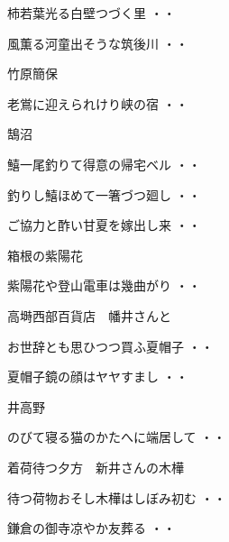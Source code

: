 \begin{shiika}柿若葉光る白壁つづく里
\hfill{・・}\end{shiika}
\begin{shiika}風薫る河童出そうな筑後川
\hfill{・・}\end{shiika}
\vspace{0.4cm}
竹原簡保
\begin{shiika}老鴬に迎えられけり峡の宿
\hfill{・・}\end{shiika}
\vspace{0.4cm}
鵠沼
\begin{shiika}鱚一尾釣りて得意の帰宅ベル
\hfill{・・}\end{shiika}
\begin{shiika}釣りし鱚ほめて一箸づつ廻し
\hfill{・・}\end{shiika}
\begin{shiika}ご協力と酢い甘夏を嫁出し来
\hfill{・・}\end{shiika}
\vspace{0.4cm}
箱根の紫陽花
\begin{shiika}紫陽花や登山電車は幾曲がり
\hfill{・・}\end{shiika}
\vspace{0.4cm}
高塒西部百貨店　幡井さんと
\begin{shiika}お世辞とも思ひつつ買ふ夏帽子
\hfill{・・}\end{shiika}
\begin{shiika}夏帽子鏡の顔はヤヤすまし
\hfill{・・}\end{shiika}
\vspace{0.4cm}
井高野
\begin{shiika}のびて寝る猫のかたへに端居して
\hfill{・・}\end{shiika}
\vspace{0.4cm}
着荷待つ夕方　新井さんの木樺
\begin{shiika}待つ荷物おそし木樺はしぼみ初む
\hfill{・・}\end{shiika}
\vspace{0.4cm}
\begin{shiika}鎌倉の御寺凉やか友葬る
\hfill{・・}\end{shiika}

